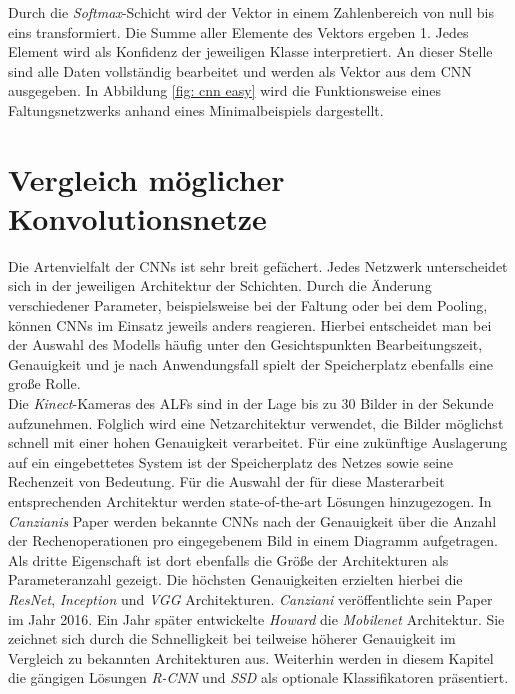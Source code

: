 		Durch die \textit{Softmax}-Schicht wird der Vektor in einem Zahlenbereich von null bis eins transformiert. Die Summe aller Elemente des Vektors ergeben 1. Jedes Element wird als Konfidenz der jeweiligen Klasse interpretiert. An dieser Stelle sind alle Daten vollständig bearbeitet und werden als Vektor aus dem CNN ausgegeben. In Abbildung \ref{fig: cnn easy} wird die Funktionsweise eines Faltungsnetzwerks anhand eines Minimalbeispiels dargestellt.\\
		
		\section{Vergleich möglicher Konvolutionsnetze}
		\label{sec: cnns}
		Die Artenvielfalt der CNNs ist sehr breit gefächert. Jedes Netzwerk unterscheidet sich in der jeweiligen Architektur der Schichten. Durch die Änderung verschiedener Parameter, beispielsweise bei der Faltung oder bei dem Pooling, können CNNs im Einsatz jeweils anders reagieren. Hierbei entscheidet man bei der Auswahl des Modells häufig unter den Gesichtspunkten Bearbeitungszeit, Genauigkeit und je nach Anwendungsfall spielt der Speicherplatz ebenfalls eine große Rolle.\\
		
		Die \textit{Kinect}-Kameras des ALFs sind in der Lage bis zu 30 Bilder in der Sekunde aufzunehmen. Folglich wird eine Netzarchitektur verwendet, die Bilder möglichst schnell mit einer hohen Genauigkeit verarbeitet. Für eine zukünftige Auslagerung auf ein eingebettetes System ist der Speicherplatz des Netzes sowie seine Rechenzeit von Bedeutung. Für die Auswahl der für diese Masterarbeit entsprechenden Architektur werden state-of-the-art Lösungen hinzugezogen. In \textit{Canzianis} Paper \cite{cnnvergleich} werden bekannte CNNs nach der Genauigkeit über die Anzahl der Rechenoperationen pro eingegebenem Bild in einem Diagramm aufgetragen. Als dritte Eigenschaft ist dort ebenfalls die Größe der Architekturen als Parameteranzahl gezeigt. Die höchsten Genauigkeiten erzielten hierbei die \textit{ResNet}, \textit{Inception} und \textit{VGG} Architekturen. \textit{Canziani} veröffentlichte sein Paper im Jahr 2016. Ein Jahr später entwickelte \textit{Howard} \cite{mobilenets} die \textit{Mobilenet} Architektur. Sie zeichnet sich durch die Schnelligkeit bei teilweise höherer Genauigkeit im Vergleich zu bekannten Architekturen aus. Weiterhin werden in diesem Kapitel die gängigen Lösungen \textit{R-CNN} und \textit{SSD} als optionale Klassifikatoren präsentiert.\\
		
